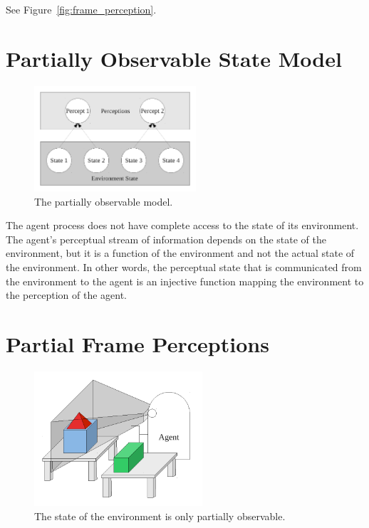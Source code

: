 See Figure~\ref{fig:frame_perception}.


\section{Partially Observable State Model}

\begin{figure}[bth]
  \center
  \includegraphics[width=6cm]{gfx/partially_observable}
  \caption[The partially observable state model]{The partially observable model.}
  \label{fig:partially_observable}
\end{figure}

The agent process does not have complete access to the state of its
environment.  The agent's perceptual stream of information depends on
the state of the environment, but it is a function of the environment
and not the actual state of the environment.  In other words, the
perceptual state that is communicated from the environment to the
agent is an injective function mapping the environment to the
perception of the agent.


\section{Partial Frame Perceptions}

\begin{figure}[bth]
  \center
  \includegraphics[height=5cm]{gfx/partial_frame_perception}
  \caption[The state of the environment is only partially
    observable.]{The state of the environment is only partially
    observable.}
  \label{fig:partial_frame_perception}
\end{figure}

